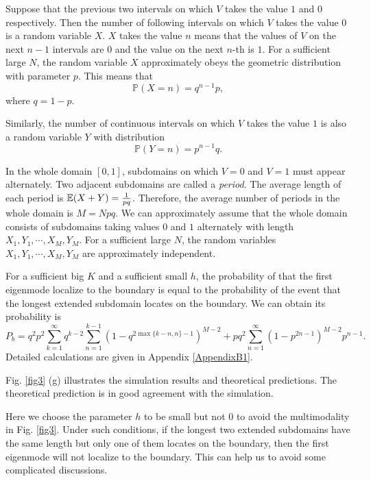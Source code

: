 \documentclass[a4paper,11pt]{article}
\begin{document}
Suppose that the previous two intervals on which $V$ takes the value $1$ and $0$ respectively. Then the number of following intervals on which $V$ takes the value $0$ is a random variable $X$. $X$ takes the value $n$ means that the values of $V$ on the next $n-1$ intervals are $0$ and the value on the next $n$-th is $1$. For a sufficient large $N$, the random variable $X$ approximately obeys the geometric distribution with parameter $p$. This means that
$$ \mathbb{P}(X = n) = q^{n-1} p, $$
where $q = 1 - p$.

Similarly, the number of continuous intervals on which $V$ takes the value $1$ is also a random variable $Y$ with distribution
$$ \mathbb{P}(Y = n) = p^{n-1} q. $$

In the whole domain $[0, 1]$, subdomains on which $V = 0$ and $V = 1$ must appear alternately. Two adjacent subdomains are called a \emph{period}. The average length of each period is $\mathbb{E}(X + Y) = \frac{1}{p q}$. Therefore, the average number of periods in the whole domain is $M = N p q$. We can approximately assume that the whole domain consists of subdomains taking values $0$ and $1$ alternately with length $X_1, Y_1, \cdots, X_M, Y_M$. For a sufficient large $N$, the random variables $X_1, Y_1, \cdots, X_M, Y_M$ are approximately independent.

For a sufficient big $K$ and a sufficient small $h$, the probability of that the first eigenmode localize to the boundary is equal to the probability of the event that the longest extended subdomain locates on the boundary. We can obtain its probability is
\begin{equation}\label{bdprob}
P_b = q^2 p^2 \sum_{k=1}^{\infty} q^{k-2} \sum_{n=1}^{k-1} (1 - q^{2 \max\{k-n,n\}-1})^{M-2} + p q^2 \sum_{n=1}^{\infty} (1 - p^{2 n-1})^{M-2} p^{n-1}.
\end{equation}
Detailed calculations are given in Appendix \ref{AppendixB1}.

Fig. \ref{fig3} (g) illustrates the simulation results and theoretical predictions. The theoretical prediction is in good agreement with the simulation.

\begin{remark}
Here we choose the parameter $h$ to be small but not $0$ to avoid the multimodality in Fig. \ref{fig3}. Under such conditions, if the longest two extended subdomains have the same length but only one of them locates on the boundary, then the first eigenmode will not localize to the boundary. This can help us to avoid some complicated discussions.
\end{remark}
\end{document}
